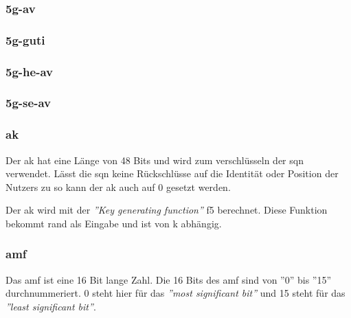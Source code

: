 \subsubsection{\gls{5g-av}}

\subsubsection{\gls{5g-guti}}

\subsubsection{\gls{5g-he-av}}

\subsubsection{\gls{5g-se-av}}

\subsubsection{\gls{ak}}
Der \gls{ak} hat eine L\"ange von 48 Bits und wird zum verschl\"usseln der \gls{sqn} verwendet. %
L\"asst die \gls{sqn} keine R\"uckschl\"usse auf die Identit\"at oder Position der Nutzers zu so kann der \gls{ak} auch auf 0 gesetzt werden. %

Der \gls{ak} wird mit der \textit{''Key generating function''} f5 berechnet. Diese Funktion bekommt \gls{rand} als Eingabe und ist von \gls{k} abh\"angig. %

\subsubsection{\gls{amf}}
Das \gls{amf} ist eine 16 Bit lange Zahl. %
Die 16 Bits des \gls{amf} sind von ''0'' bis ''15'' durchnummeriert. %
0 steht hier f\"ur das \textit{''most significant bit''} und 15 steht f\"ur das \textit{''least significant bit''}.

